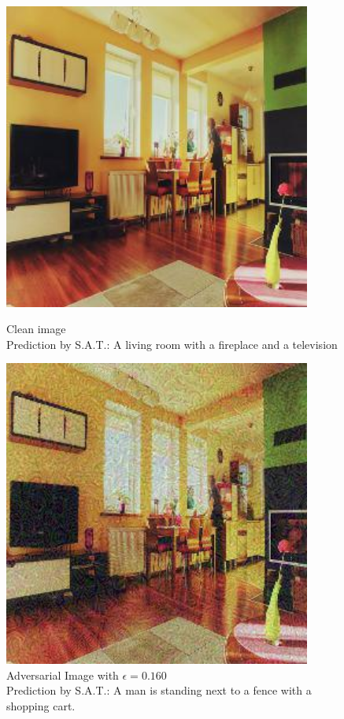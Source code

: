 \begin{figure}[ht]
    \centering
    \begin{minipage}{0.45\textwidth}
        \centering
        \includegraphics[width=0.9\textwidth]{../code/ShowDistractAndDeceive/samples/0.000/img_0.jpg} %
        \caption*{Clean image\\Prediction by S.A.T.: A living room with a fireplace and a television}
    \end{minipage}\hfill
    \begin{minipage}{0.45\textwidth}
        \centering
        \includegraphics[width=0.9\textwidth]{../code/ShowDistractAndDeceive/samples/0.160/img_0.jpg} %
        \caption*{Adversarial Image with $\epsilon=0.160$\\Prediction by S.A.T.: A man is standing next to a fence with a shopping cart.}
    \end{minipage}
\end{figure}

